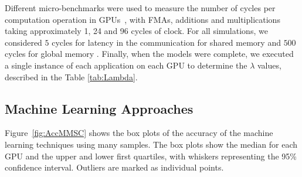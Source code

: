 Different micro-benchmarks were used to measure the number of cycles per computation operation in GPUs~\cite{Bench:GPU}, with FMAs, additions and multiplications taking approximately 1, 24 and 96 cycles of clock. For all simulations, we considered $5$ cycles for latency in the communication for shared memory and $500$ cycles for global memory \cite{CUDAGuide}. Finally, when the models were complete, we executed a single instance of each application on each GPU to determine the $\lambda$ values, described in the Table \ref{tab:Lambda}.

\begin{table}[H]
\centering
\caption{Values of the parameter $\lambda$ for each application in each GPU}
\label{tab:Lambda} 
\end{table}

\subsection{Machine Learning Approaches}\label{subsec:ML}

Figure~\ref{fig:AccMMSC} shows the box plots of the accuracy of the machine learning techniques using many samples. The box plots show the median for each GPU and the upper and lower first quartiles, with whiskers representing the 95\% confidence interval. Outliers are marked as individual points.

